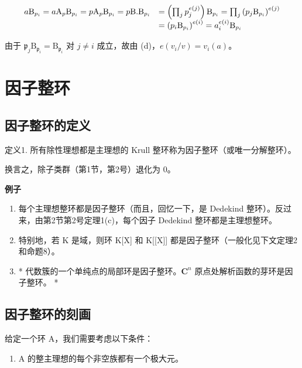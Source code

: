 \[
\begin{array}{r l} a \mathrm{B} _ {p _ {i}} = a \mathrm{A} _ {p} \mathrm{B} _ {p _ {i}} = p \mathrm{A} _ {p} \mathrm{B} _ {p _ {i}} = p \mathrm{B}. \mathrm{B} _ {p _ {i}} & = \left(\prod_ {j} p _ {j} ^ {e (j)}\right) \mathrm{B} _ {p _ {i}} = \prod_ {j} \left(p _ {j} \mathrm{B} _ {p _ {i}}\right) ^ {e (j)} \\ & = \left(p _ {i} \mathrm{B} _ {p _ {i}}\right) ^ {e (i)} = a _ {i} ^ {e (i)} \mathrm{B} _ {p _ {i}} \end{array}
\]

由于 \(\mathfrak{p}_j\mathrm{B}_{\mathfrak{p}_i} = \mathrm{B}_{\mathfrak{p}_i}\) 对 \(j\neq i\) 成立，故由 (d)，\(e(v_{i} / v) = v_{i}(a)\)。

\section{因子整环}

\subsection{因子整环的定义}

定义1. 所有除性理想都是主理想的 Krull 整环称为因子整环（或唯一分解整环）。

换言之，除子类群（第1节，第2号）退化为 0。

\textbf{例子}\par

\begin{enumerate}
\def\labelenumi{(\arabic{enumi})}
\item
  每个主理想整环都是因子整环（而且，回忆一下，是 Dedekind 整环）。反过来，由第2节第2号定理1(c)，每个因子 Dedekind 整环都是主理想整环。
\item
  特别地，若 K 是域，则环 K{[}X{]} 和 K{[}{[}X{]}{]} 都是因子整环（一般化见下文定理2和命题8）。
\item
  * 代数簇的一个单纯点的局部环是因子整环。\(\mathbf{C}^n\) 原点处解析函数的芽环是因子整环。 *
\end{enumerate}

\subsection{因子整环的刻画}

给定一个环 A，我们需要考虑以下条件：

\begin{enumerate}
\def\labelenumi{(\Alph{enumi})}
\setcounter{enumi}{12}
\tightlist
\item
  A 的整主理想的每个非空族都有一个极大元。
\end{enumerate}

